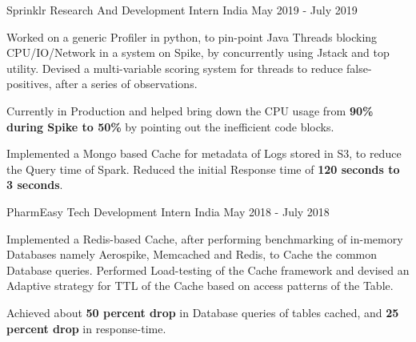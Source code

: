\begin{cventries}

  \cventry
  {Sprinklr}
  {Research And Development Intern}
  {India}
  {May 2019 - July 2019}
  {
    \begin{cvitems}
      \item Worked on a generic Profiler in python, to pin-point Java Threads blocking CPU/IO/Network in a system on Spike, by concurrently using Jstack and top utility. Devised a multi-variable scoring system for threads to reduce false-positives, after a series of observations.
      \item	Currently in Production and helped bring down the CPU usage from \textbf{90\% during Spike to 50\%} by pointing out the inefficient code blocks. 
      \item Implemented a Mongo based Cache for metadata of Logs stored in S3, to reduce the Query time of Spark. Reduced the initial Response time of \textbf{120 seconds to 3 seconds}.
    \end{cvitems}
  }

  \cventry
  {PharmEasy}
  {Tech Development Intern}
  {India}
  {May 2018 - July 2018}
  {
    \begin{cvitems}
      \item Implemented a Redis-based Cache, after performing benchmarking of in-memory Databases namely Aerospike, Memcached and Redis, to Cache the common Database queries. Performed Load-testing of the Cache framework and devised an Adaptive strategy for TTL of the Cache based on access patterns of the Table.
      \item Achieved about \textbf{50 percent drop} in Database queries of tables cached, and \textbf{25
percent drop} in response-time.
    \end{cvitems}
  }

\end{cventries}
\vspace{-2mm}

